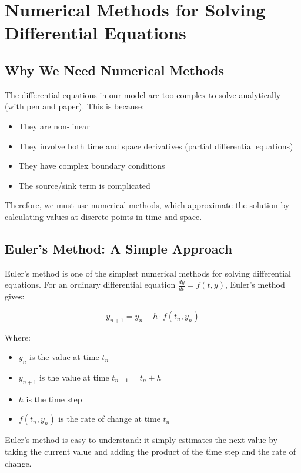 \documentclass[a4paper,12pt]{article}
\begin{document}
\section{Numerical Methods for Solving Differential Equations}

\subsection{Why We Need Numerical Methods}

The differential equations in our model are too complex to solve analytically (with pen and paper). This is because:
\begin{itemize}
    \item They are non-linear
    \item They involve both time and space derivatives (partial differential equations)
    \item They have complex boundary conditions
    \item The source/sink term is complicated
\end{itemize}

Therefore, we must use numerical methods, which approximate the solution by calculating values at discrete points in time and space.

\subsection{Euler's Method: A Simple Approach}

Euler's method is one of the simplest numerical methods for solving differential equations. For an ordinary differential equation $\frac{dy}{dt} = f(t, y)$, Euler's method gives:

\begin{equation}
y_{n+1} = y_n + h \cdot f(t_n, y_n)
\end{equation}

Where:
\begin{itemize}
    \item $y_n$ is the value at time $t_n$
    \item $y_{n+1}$ is the value at time $t_{n+1} = t_n + h$
    \item $h$ is the time step
    \item $f(t_n, y_n)$ is the rate of change at time $t_n$
\end{itemize}

Euler's method is easy to understand: it simply estimates the next value by taking the current value and adding the product of the time step and the rate of change.
\end{document}
